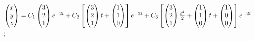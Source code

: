 \begin{enumsolsfull}
		\item \( \begin{pmatrix} x \\ y \\ z \end{pmatrix} = C_1 \begin{pmatrix} 3 \\ 2 \\ 1 \end{pmatrix} e^{-2t} + C_2 \left[ \begin{pmatrix} 3 \\ 2 \\ 1 \end{pmatrix} t + \begin{pmatrix} 1 \\ 1 \\ 0 \end{pmatrix} \right] e^{-2t} + C_3 \left[ \begin{pmatrix} 3 \\ 2 \\ 1 \end{pmatrix} \frac{t^2}{2} + \begin{pmatrix} 1 \\ 1 \\ 0 \end{pmatrix} t + \begin{pmatrix} 1 \\ 0 \\ 0 \end{pmatrix} \right] e^{-2t} \); %

\end{enumsolsfull}
